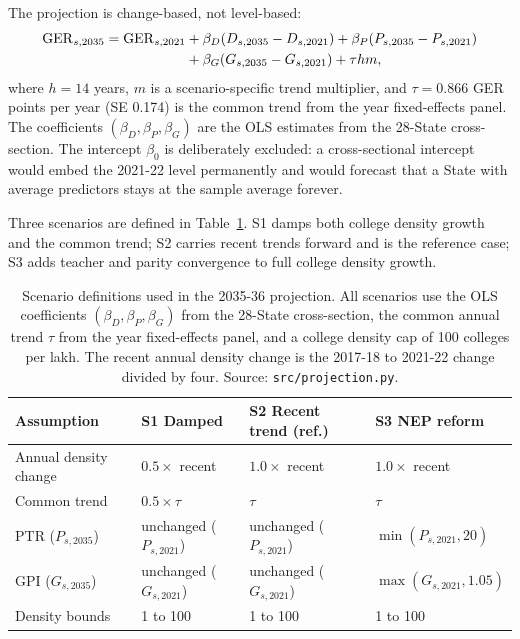 The projection is change-based, not level-based:
\begin{equation}
\begin{aligned}
\mathrm{GER}_{s,2035} = \mathrm{GER}_{s,2021} &+ \beta_D (D_{s,2035} - D_{s,2021}) + \beta_P (P_{s,2035} - P_{s,2021}) \\
&+ \beta_G (G_{s,2035} - G_{s,2021}) + \tau h m,
\end{aligned}
\label{eq:projection}
\end{equation}
where \(h = 14\) years, \(m\) is a scenario-specific trend multiplier, and \(\tau = 0.866\) GER points per year (SE 0.174) is the common trend from the year fixed-effects panel. The coefficients \((\beta_D, \beta_P, \beta_G)\) are the OLS estimates from the 28-State cross-section. The intercept \(\beta_0\) is deliberately excluded: a cross-sectional intercept would embed the 2021-22 level permanently and would forecast that a State with average predictors stays at the sample average forever.

Three scenarios are defined in Table~\ref{tab:scenarios}. S1 damps both college density growth and the common trend; S2 carries recent trends forward and is the reference case; S3 adds teacher and parity convergence to full college density growth.

\begin{table}[htbp]
\centering
\scriptsize
\setlength{\tabcolsep}{3pt}
\caption{Scenario definitions used in the 2035-36 projection. All scenarios use the OLS coefficients \((\beta_D, \beta_P, \beta_G)\) from the 28-State cross-section, the common annual trend \(\tau\) from the year fixed-effects panel, and a college density cap of 100 colleges per lakh. The recent annual density change is the 2017-18 to 2021-22 change divided by four. Source: \texttt{src/projection.py}.}
\label{tab:scenarios}
\begin{tabular}{@{}p{2.9cm}p{2.7cm}p{2.8cm}p{2.9cm}@{}}
\toprule
Assumption & S1 Damped & S2 Recent trend (ref.) & S3 NEP reform \\
\midrule
Annual density change & \(0.5 \times\) recent & \(1.0 \times\) recent & \(1.0 \times\) recent \\
Common trend & \(0.5 \times \tau\) & \(\tau\) & \(\tau\) \\
PTR (\(P_{s,2035}\)) & unchanged (\(P_{s,2021}\)) & unchanged (\(P_{s,2021}\)) & \(\min(P_{s,2021},20)\) \\
GPI (\(G_{s,2035}\)) & unchanged (\(G_{s,2021}\)) & unchanged (\(G_{s,2021}\)) & \(\max(G_{s,2021}, 1.05)\) \\
Density bounds & 1 to 100 & 1 to 100 & 1 to 100 \\
\bottomrule
\end{tabular}
\end{table}

